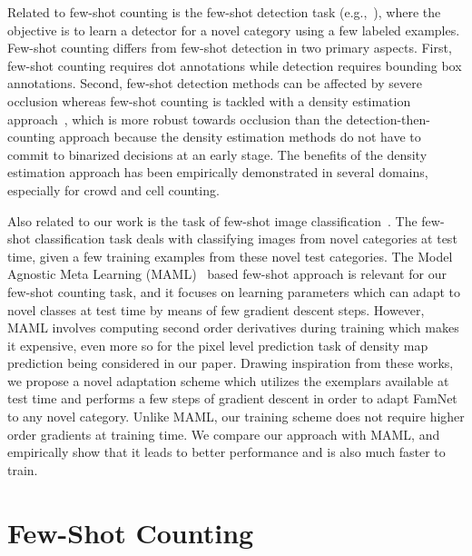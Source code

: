 Related to few-shot counting is the few-shot detection task (e.g.,~\cite{kang2019few,fan2020few}), where the objective is to learn a detector for a novel category using a few labeled examples. Few-shot counting differs from few-shot detection in two primary aspects. First, few-shot counting requires dot annotations while detection requires bounding box annotations. Second, few-shot detection methods can be affected by severe occlusion whereas few-shot counting is tackled with a density estimation approach~\cite{Lempitsky-Zisserman-NIPS10,zhang2016single}, which is more robust towards occlusion than the detection-then-counting approach because the density estimation methods do not have to commit to binarized decisions at an early stage. The benefits of the density estimation approach has been empirically demonstrated in several domains, especially for crowd and cell counting.

Also related to our work is the task of few-shot image classification~\cite{lake2015human,koch2015siamese,vinyals2016matching,santoro2016one,finn2017model,ravi2016optimization}. The few-shot classification task deals with classifying images from novel categories at test time, given a few training examples from these novel test categories.
The Model Agnostic Meta Learning (MAML)~\cite{finn2017model} based few-shot approach is relevant for our few-shot counting task, and it focuses on learning parameters which can adapt to novel classes at test time by means of few gradient descent steps. However, MAML involves computing second order derivatives during training which makes it expensive, even more so for the pixel level prediction task of density map prediction being considered in our paper. Drawing inspiration from these works, we propose a novel adaptation scheme which utilizes the exemplars available at test time and performs a few steps of gradient descent in order to adapt FamNet to any novel category. Unlike MAML, our training scheme does not require higher order gradients at training time. We compare our approach with MAML, and empirically show that it leads to better performance and is also much faster to train.

\iffalse
\section{Few-Shot Counting}\label{sec:FewShotCounting}

